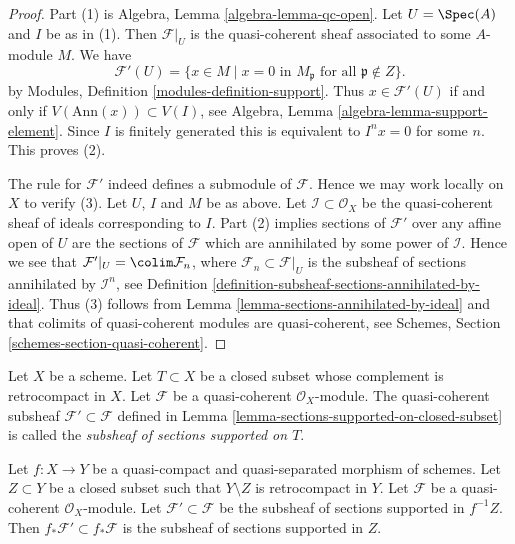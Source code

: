 \begin{proof}
Part (1) is Algebra, Lemma \ref{algebra-lemma-qc-open}.
Let $U = \Spec(A)$ and $I$ be as in (1).
Then $\mathcal{F}|_U$ is the quasi-coherent sheaf associated to
some $A$-module $M$. We have
$$
\mathcal{F}'(U) = \{x \in M \mid x = 0\text{ in }M_\mathfrak p
\text{ for all }\mathfrak p \not \in Z\}.
$$
by Modules, Definition \ref{modules-definition-support}. Thus
$x \in \mathcal{F}'(U)$ if and only if $V(\text{Ann}(x)) \subset V(I)$, see
Algebra, Lemma \ref{algebra-lemma-support-element}. Since $I$ is
finitely generated this is equivalent to $I^n x = 0$ for some $n$.
This proves (2).

\medskip\noindent
The rule for $\mathcal{F}'$ indeed defines a submodule of $\mathcal{F}$.
Hence we may work locally on $X$ to verify (3). Let $U$, $I$ and $M$ be
as above. Let $\mathcal{I} \subset \mathcal{O}_X$ be the quasi-coherent
sheaf of ideals corresponding to $I$. Part (2) implies
sections of $\mathcal{F}'$ over any affine open of $U$ are the sections
of $\mathcal{F}$ which are annihilated by some power of $\mathcal{I}$.
Hence we see that $\mathcal{F}'|_U = \colim \mathcal{F}_n$, where
$\mathcal{F}_n \subset \mathcal{F}|_U$ is the subsheaf of sections
annihilated by $\mathcal{I}^n$, see
Definition \ref{definition-subsheaf-sections-annihilated-by-ideal}.
Thus (3) follows from Lemma \ref{lemma-sections-annihilated-by-ideal}
and that colimits of quasi-coherent modules are quasi-coherent,
see Schemes, Section \ref{schemes-section-quasi-coherent}.
\end{proof}

\begin{definition}
\label{definition-subsheaf-sections-supported-on-closed}
Let $X$ be a scheme.
Let $T \subset X$ be a closed subset whose complement
is retrocompact in $X$.
Let $\mathcal{F}$ be a quasi-coherent $\mathcal{O}_X$-module.
The quasi-coherent subsheaf $\mathcal{F}' \subset \mathcal{F}$ defined in
Lemma \ref{lemma-sections-supported-on-closed-subset} is called
the {\it subsheaf of sections supported on $T$}.
\end{definition}

\begin{lemma}
\label{lemma-push-sections-supported-on-closed-subset}
Let $f : X \to Y$ be a quasi-compact and quasi-separated morphism
of schemes. Let $Z \subset Y$ be a closed subset such that
$Y \setminus Z$ is retrocompact in $Y$. Let $\mathcal{F}$ be a quasi-coherent
$\mathcal{O}_X$-module. Let $\mathcal{F}' \subset \mathcal{F}$
be the subsheaf of sections supported in $f^{-1}Z$.
Then $f_*\mathcal{F}' \subset f_*\mathcal{F}$ is the subsheaf
of sections supported in $Z$.
\end{lemma}

